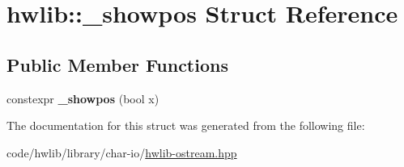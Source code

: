 \hypertarget{structhwlib_1_1__showpos}{}\section{hwlib\+:\+:\+\_\+showpos Struct Reference}
\label{structhwlib_1_1__showpos}
\subsection*{Public Member Functions}
\begin{DoxyCompactItemize}
\item 
\mbox{\label{structhwlib_1_1__showpos_acc9f9e1970e3b70823e9dac74dc942b0}} 
constexpr {\bfseries \+\_\+showpos} (bool x)
\end{DoxyCompactItemize}


The documentation for this struct was generated from the following file\+:\begin{DoxyCompactItemize}
\item 
code/hwlib/library/char-\/io/\hyperlink{hwlib-ostream_8hpp}{hwlib-\/ostream.\+hpp}\end{DoxyCompactItemize}
